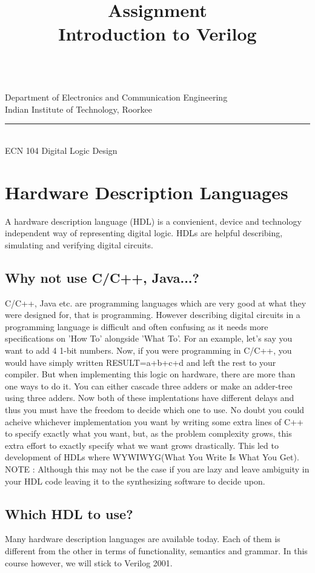 \documentclass[a4paper,10pt]{article}
\makeatletter
\newcommand{\linia}{\rule{\linewidth}{0.5pt}}
\newcommand{\ano}{\text{1}}
\theoremstyle{mytheor}
\renewcommand{\maketitle}{
\begin{center}
\vspace{2ex}
{\huge \textsc{\@title}}
\vspace{1ex}
\\
Department of Electronics and Communication Engineering \\
Indian Institute of Technology, Roorkee
\linia\\
ECN 104 \hfill Digital Logic Design
\vspace{4ex}
\end{center}
}
\makeatother
\begin{document}
\title{Assignment \ano \\ Introduction to Verilog}

\maketitle

\section*{Hardware Description Languages}
A hardware description language (HDL) is a convienient, device and technology independent way of representing digital logic. HDLs are helpful describing, simulating and verifying digital circuits.

\subsection*{Why not use C/C++, Java...?} 
C/C++, Java etc. are programming languages which are very good at what they were designed for, that is programming. However describing digital circuits in a programming language is difficult and often confusing as it needs more specifications on 'How To' alongside 'What To'. For an example, let's say you want to add 4 1-bit numbers. Now, if you were programming in C/C++, you would have simply written RESULT=a+b+c+d and left the rest to your compiler. But when implementing this logic on hardware, there are more than one ways to do it. You can either cascade three adders or make an adder-tree using three adders. Now both of these implentations have different delays and thus you must have the freedom to decide which one to use. No doubt you could acheive whichever implementation you want by writing some extra lines of C++ to specify exactly what you want, but, as the problem complexity grows, this extra effort to exactly specify what we want grows drastically. This led to development of HDLs where WYWIWYG(What You Write Is What You Get). NOTE : Although this may not be the case if you are lazy and leave ambiguity in your HDL code leaving it to the synthesizing software to decide upon. 

\subsection*{Which HDL to use?}
Many hardware description languages are available today. Each of them is different from the other in terms of functionality, semantics and grammar. In this course however, we will stick to Verilog  2001.
\end{document}
